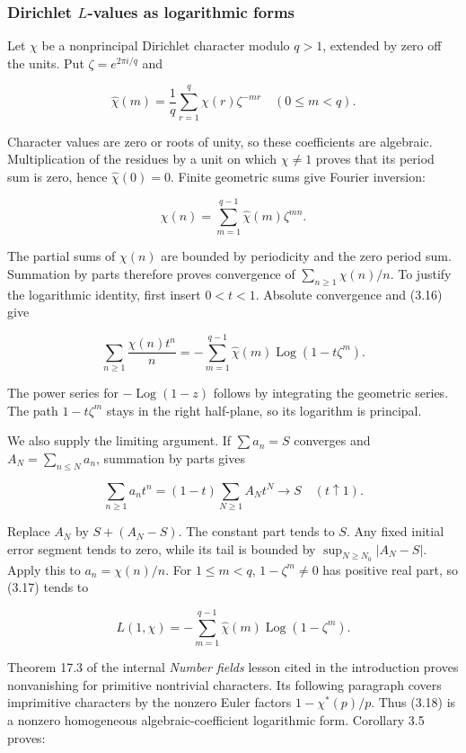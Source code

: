 \documentclass[
  11pt,
  a4paper,
]{article}
\begin{document}
\subsubsection{\texorpdfstring{Dirichlet \(L\)-values as logarithmic
forms}{Dirichlet L-values as logarithmic forms}}\label{dirichlet-l-values-as-logarithmic-forms}

Let \(\chi\) be a nonprincipal Dirichlet character modulo \(q>1\),
extended by zero off the units. Put \(\zeta=e^{2\pi i/q}\) and

\[
\widehat\chi(m)=\frac1q\sum_{r=1}^q\chi(r)\zeta^{-mr}\quad(0\le m<q).
\]

Character values are zero or roots of unity, so these coefficients are
algebraic. Multiplication of the residues by a unit on which
\(\chi\ne1\) proves that its period sum is zero, hence
\(\widehat\chi(0)=0\). Finite geometric sums give Fourier inversion:

\[
\chi(n)=\sum_{m=1}^{q-1}\widehat\chi(m)\zeta^{mn}. \tag{3.16}
\]

The partial sums of \(\chi(n)\) are bounded by periodicity and the zero
period sum. Summation by parts therefore proves convergence of
\(\sum_{n\ge1}\chi(n)/n\). To justify the logarithmic identity, first
insert \(0<t<1\). Absolute convergence and (3.16) give

\[
\sum_{n\ge1}\frac{\chi(n)t^n}{n}
=-\sum_{m=1}^{q-1}\widehat\chi(m)\operatorname{Log}(1-t\zeta^m). \tag{3.17}
\]

The power series for \(-\operatorname{Log}(1-z)\) follows by integrating
the geometric series. The path \(1-t\zeta^m\) stays in the right
half-plane, so its logarithm is principal.

We also supply the limiting argument. If \(\sum a_n=S\) converges and
\(A_N=\sum_{n\le N}a_n\), summation by parts gives

\[
\sum_{n\ge1}a_nt^n=(1-t)\sum_{N\ge1}A_Nt^N\longrightarrow S\quad(t\uparrow1).
\]

Replace \(A_N\) by \(S+(A_N-S)\). The constant part tends to \(S\). Any
fixed initial error segment tends to zero, while its tail is bounded by
\(\sup_{N\ge N_0}|A_N-S|\). Apply this to \(a_n=\chi(n)/n\). For
\(1\le m<q\), \(1-\zeta^m\ne0\) has positive real part, so (3.17) tends
to

\[
L(1,\chi)=-\sum_{m=1}^{q-1}\widehat\chi(m)\operatorname{Log}(1-\zeta^m). \tag{3.18}
\]

Theorem 17.3 of the internal \emph{Number fields} lesson cited in the
introduction proves nonvanishing for primitive nontrivial characters.
Its following paragraph covers imprimitive characters by the nonzero
Euler factors \(1-\chi^*(p)/p\). Thus (3.18) is a nonzero homogeneous
algebraic-coefficient logarithmic form. Corollary 3.5 proves:
\end{document}
